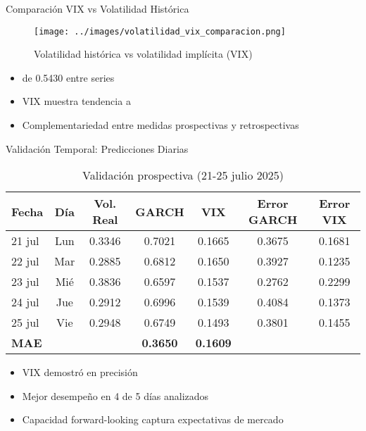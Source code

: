 \begin{frame}{Comparación VIX vs Volatilidad Histórica}
    \begin{figure}
        \centering
        \texttt{[image: ../images/volatilidad\_vix\_comparacion.png]}
        \caption{Volatilidad histórica vs volatilidad implícita (VIX)}
    \end{figure}
        
    \begin{itemize}
        \item<2->  de 0.5430 entre series
        \item<3-> VIX muestra tendencia a 
        \item<4-> Complementariedad entre medidas prospectivas y retrospectivas
    \end{itemize}
\end{frame}

\begin{frame}{Validación Temporal: Predicciones Diarias}
    \begin{table}
        \centering
        \tiny
        \begin{tabular}{lcccccc}
            \toprule
            \textbf{Fecha} & \textbf{Día} & \textbf{Vol. Real} & \textbf{GARCH} & \textbf{VIX} & \textbf{Error GARCH} & \textbf{Error VIX} \\
            \midrule
            21 jul & Lun & 0.3346 & 0.7021 & 0.1665 & 0.3675 & 0.1681 \\
            22 jul & Mar & 0.2885 & 0.6812 & 0.1650 & 0.3927 & 0.1235 \\
            23 jul & Mié & 0.3836 & 0.6597 & 0.1537 & 0.2762 & 0.2299 \\
            24 jul & Jue & 0.2912 & 0.6996 & 0.1539 & 0.4084 & 0.1373 \\
            25 jul & Vie & 0.2948 & 0.6749 & 0.1493 & 0.3801 & 0.1455 \\
            \midrule
            \textbf{MAE} & & & \textbf{0.3650} & \textbf{0.1609} & & \\
            \bottomrule
        \end{tabular}
        \caption{Validación prospectiva (21-25 julio 2025)}
    \end{table}
    
    \vspace{0.2em}
    
    \begin{itemize}
        \item<2-> VIX demostró  en precisión
        \item<3-> Mejor desempeño en 4 de 5 días analizados
        \item<4-> Capacidad forward-looking captura expectativas de mercado
    \end{itemize}
\end{frame}
